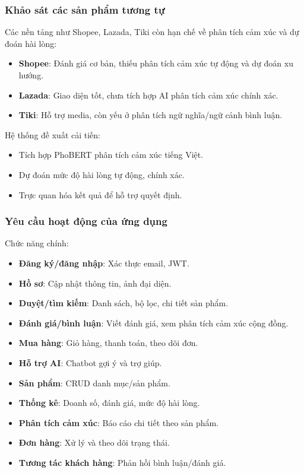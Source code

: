 \subsubsection{Khảo sát các sản phẩm tương tự}
Các nền tảng như Shopee, Lazada, Tiki còn hạn chế về phân tích cảm xúc và dự đoán hài lòng:
\begin{itemize}
    \item \textbf{Shopee}: Đánh giá cơ bản, thiếu phân tích cảm xúc tự động và dự đoán xu hướng.
    \item \textbf{Lazada}: Giao diện tốt, chưa tích hợp AI phân tích cảm xúc chính xác.
    \item \textbf{Tiki}: Hỗ trợ media, còn yếu ở phân tích ngữ nghĩa/ngữ cảnh bình luận.
\end{itemize}
Hệ thống đề xuất cải tiến:
\begin{itemize}
    \item Tích hợp PhoBERT phân tích cảm xúc tiếng Việt.
    \item Dự đoán mức độ hài lòng tự động, chính xác.
    \item Trực quan hóa kết quả để hỗ trợ quyết định.
\end{itemize}

\subsubsection{Yêu cầu hoạt động của ứng dụng}
Chức năng chính:
\begin{itemize}
    \item \textbf{Đăng ký/đăng nhập}: Xác thực email, JWT.
    \item \textbf{Hồ sơ}: Cập nhật thông tin, ảnh đại diện.
    \item \textbf{Duyệt/tìm kiếm}: Danh sách, bộ lọc, chi tiết sản phẩm.
    \item \textbf{Đánh giá/bình luận}: Viết đánh giá, xem phân tích cảm xúc cộng đồng.
    \item \textbf{Mua hàng}: Giỏ hàng, thanh toán, theo dõi đơn.
    \item \textbf{Hỗ trợ AI}: Chatbot gợi ý và trợ giúp.
\end{itemize}

\begin{itemize}
    \item \textbf{Sản phẩm}: CRUD danh mục/sản phẩm.
    \item \textbf{Thống kê}: Doanh số, đánh giá, mức độ hài lòng.
    \item \textbf{Phân tích cảm xúc}: Báo cáo chi tiết theo sản phẩm.
    \item \textbf{Đơn hàng}: Xử lý và theo dõi trạng thái.
    \item \textbf{Tương tác khách hàng}: Phản hồi bình luận/đánh giá.
\end{itemize}

